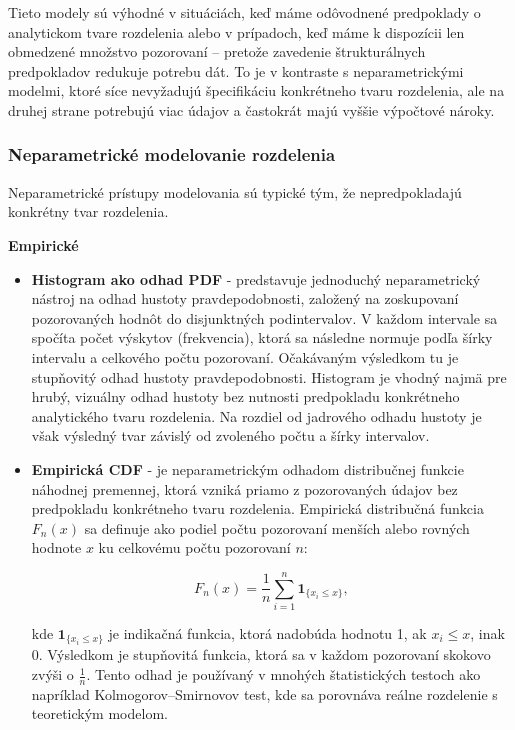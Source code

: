 Tieto modely sú výhodné v situáciách, keď máme odôvodnené predpoklady o analytickom tvare rozdelenia alebo v prípadoch, keď máme k dispozícii len obmedzené množstvo pozorovaní – pretože zavedenie štrukturálnych predpokladov redukuje potrebu dát. To je v kontraste s neparametrickými modelmi, ktoré síce nevyžadujú špecifikáciu konkrétneho tvaru rozdelenia, ale na druhej strane potrebujú viac údajov a častokrát majú vyššie výpočtové nároky.

\subsubsection{Neparametrické modelovanie rozdelenia}\label{subsubsection:nonparametric_models}

Neparametrické prístupy modelovania sú typické tým, že nepredpokladajú konkrétny tvar rozdelenia.

\textbf{Empirické}

\begin{itemize}
  \item \textbf{Histogram ako odhad PDF} - predstavuje jednoduchý neparametrický nástroj na odhad hustoty pravdepodobnosti, založený na zoskupovaní pozorovaných hodnôt do disjunktných podintervalov. V každom intervale sa spočíta počet výskytov (frekvencia), ktorá sa následne normuje podľa šírky intervalu a celkového počtu pozorovaní. Očakávaným výsledkom tu je stupňovitý odhad hustoty pravdepodobnosti. Histogram je vhodný najmä pre hrubý, vizuálny odhad hustoty bez nutnosti predpokladu konkrétneho analytického tvaru rozdelenia. Na rozdiel od jadrového odhadu hustoty je však výsledný tvar závislý od zvoleného počtu a šírky intervalov.
  \item \textbf{Empirická CDF} - je neparametrickým odhadom distribučnej funkcie náhodnej premennej, ktorá vzniká priamo z pozorovaných údajov bez predpokladu konkrétneho tvaru rozdelenia. Empirická distribučná funkcia $F_n(x)$ sa definuje ako podiel počtu pozorovaní menších alebo rovných hodnote $x$ ku celkovému počtu pozorovaní $n$:
  
  \begin{equation}
  F_n(x) = \frac{1}{n} \sum_{i=1}^{n} \mathbf{1}_{\{x_i \leq x\}},
  \end{equation}

  kde $\mathbf{1}_{\{x_i \leq x\}}$ je indikačná funkcia, ktorá nadobúda hodnotu 1, ak $x_i \leq x$, inak 0. Výsledkom je stupňovitá funkcia, ktorá sa v každom pozorovaní skokovo zvýši o $\frac{1}{n}$. Tento odhad je používaný v mnohých štatistických testoch ako napríklad Kolmogorov–Smirnovov test, kde sa porovnáva reálne rozdelenie s teoretickým modelom.
\end{itemize}


